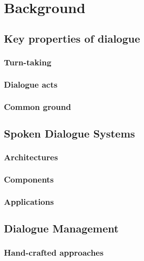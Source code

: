 
\chapter{Background}
\label{chap:background}

\section{Key properties of dialogue}

\subsection{Turn-taking}

\subsection{Dialogue acts}

\subsection{Common ground}




\section{Spoken Dialogue Systems}
 
\subsection{Architectures}


\subsection{Components}

\subsection{Applications}

\section{Dialogue Management}

\subsection{Hand-crafted approaches}

